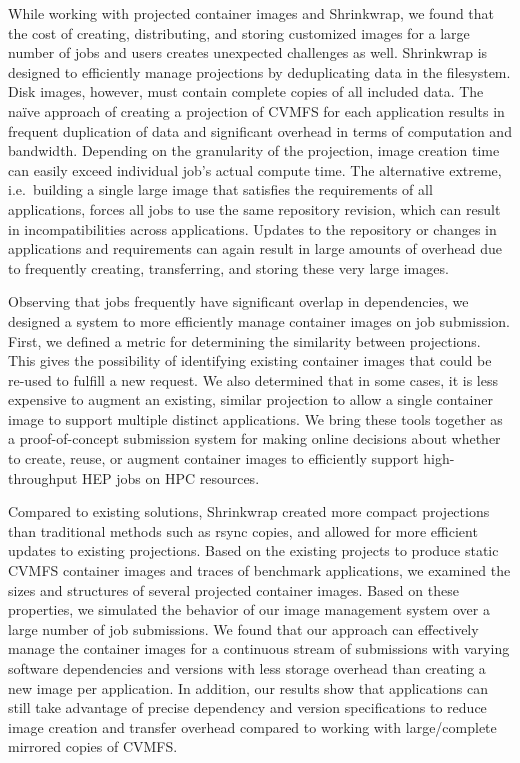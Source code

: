 \documentclass[sigconf]{acmart}
\begin{document}
While working with projected container images and Shrinkwrap,
we found that the cost of creating, distributing, and storing customized images for a large number of jobs and users creates unexpected challenges as well.
Shrinkwrap is designed to efficiently manage projections by deduplicating data in the filesystem.
Disk images, however, must contain complete copies of all included data.
The na\"{i}ve approach of creating a projection of CVMFS for each application results in frequent duplication of data and significant overhead in terms of computation and bandwidth.
Depending on the granularity of the projection,
image creation time can easily exceed individual job's actual compute time.
The alternative extreme, i.e.\ building a single large image that satisfies the requirements of all applications,
forces all jobs to use the same repository revision,
which can result in incompatibilities across applications.
Updates to the repository or changes in applications and requirements can again result in large amounts of overhead due to frequently creating, transferring, and storing these very large images.

Observing that jobs frequently have significant overlap in dependencies,
we designed a system to more efficiently manage container images on job submission.
First, we defined a metric for determining the similarity between projections.
This gives the possibility of identifying existing container images that could be re-used to fulfill a new request.
We also determined that in some cases,
it is less expensive to augment an existing, similar projection to allow a single container image to support multiple distinct applications.
We bring these tools together as a proof-of-concept submission system for making online decisions about whether to create, reuse, or augment container images to efficiently support high-throughput HEP jobs on HPC resources. 

Compared to existing solutions,
Shrinkwrap created more compact projections than traditional methods such as rsync copies,
and allowed for more efficient updates to existing projections.
Based on the existing projects to produce static CVMFS container images and traces of benchmark applications,
we examined the sizes and structures of several projected container images.
Based on these properties,
we simulated the behavior of our image management system over a large number of job submissions.
We found that our approach can effectively manage the container images for a continuous stream of submissions with varying software dependencies and versions with less storage overhead than creating a new image per application.
In addition, our results show that applications can still take advantage of precise dependency and version specifications to reduce image creation and transfer overhead compared to working with large/complete mirrored copies of CVMFS.
\end{document}

